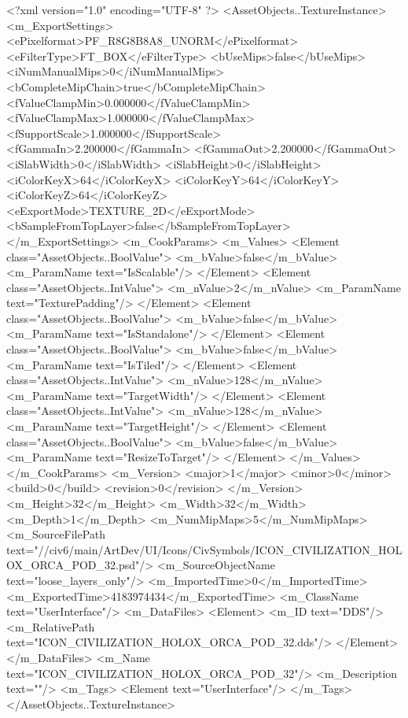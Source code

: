 <?xml version="1.0" encoding="UTF-8" ?>
<AssetObjects..TextureInstance>
	<m_ExportSettings>
		<ePixelformat>PF_R8G8B8A8_UNORM</ePixelformat>
		<eFilterType>FT_BOX</eFilterType>
		<bUseMips>false</bUseMips>
		<iNumManualMips>0</iNumManualMips>
		<bCompleteMipChain>true</bCompleteMipChain>
		<fValueClampMin>0.000000</fValueClampMin>
		<fValueClampMax>1.000000</fValueClampMax>
		<fSupportScale>1.000000</fSupportScale>
		<fGammaIn>2.200000</fGammaIn>
		<fGammaOut>2.200000</fGammaOut>
		<iSlabWidth>0</iSlabWidth>
		<iSlabHeight>0</iSlabHeight>
		<iColorKeyX>64</iColorKeyX>
		<iColorKeyY>64</iColorKeyY>
		<iColorKeyZ>64</iColorKeyZ>
		<eExportMode>TEXTURE_2D</eExportMode>
		<bSampleFromTopLayer>false</bSampleFromTopLayer>
	</m_ExportSettings>
	<m_CookParams>
		<m_Values>
			<Element class="AssetObjects..BoolValue">
				<m_bValue>false</m_bValue>
				<m_ParamName text="IsScalable"/>
			</Element>
			<Element class="AssetObjects..IntValue">
				<m_nValue>2</m_nValue>
				<m_ParamName text="TexturePadding"/>
			</Element>
			<Element class="AssetObjects..BoolValue">
				<m_bValue>false</m_bValue>
				<m_ParamName text="IsStandalone"/>
			</Element>
			<Element class="AssetObjects..BoolValue">
				<m_bValue>false</m_bValue>
				<m_ParamName text="IsTiled"/>
			</Element>
			<Element class="AssetObjects..IntValue">
				<m_nValue>128</m_nValue>
				<m_ParamName text="TargetWidth"/>
			</Element>
			<Element class="AssetObjects..IntValue">
				<m_nValue>128</m_nValue>
				<m_ParamName text="TargetHeight"/>
			</Element>
			<Element class="AssetObjects..BoolValue">
				<m_bValue>false</m_bValue>
				<m_ParamName text="ResizeToTarget"/>
			</Element>
		</m_Values>
	</m_CookParams>
	<m_Version>
		<major>1</major>
		<minor>0</minor>
		<build>0</build>
		<revision>0</revision>
	</m_Version>
	<m_Height>32</m_Height>
	<m_Width>32</m_Width>
	<m_Depth>1</m_Depth>
	<m_NumMipMaps>5</m_NumMipMaps>
	<m_SourceFilePath text="//civ6/main/ArtDev/UI/Icons/CivSymbols/ICON_CIVILIZATION_HOLOX_ORCA_POD_32.psd"/>
	<m_SourceObjectName text="loose_layers_only"/>
	<m_ImportedTime>0</m_ImportedTime>
	<m_ExportedTime>4183974434</m_ExportedTime>
	<m_ClassName text="UserInterface"/>
	<m_DataFiles>
		<Element>
			<m_ID text="DDS"/>
			<m_RelativePath text="ICON_CIVILIZATION_HOLOX_ORCA_POD_32.dds"/>
		</Element>
	</m_DataFiles>
	<m_Name text="ICON_CIVILIZATION_HOLOX_ORCA_POD_32"/>
	<m_Description text=""/>
	<m_Tags>
		<Element text="UserInterface"/>
	</m_Tags>
</AssetObjects..TextureInstance>

